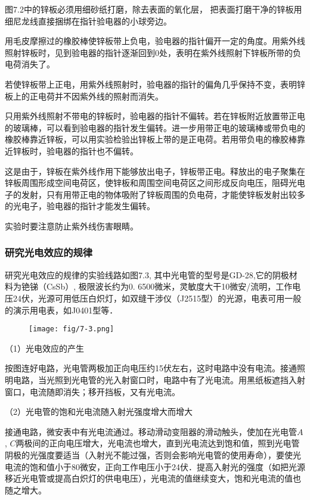 图7.2中的锌板必须用细砂纸打磨，除去表面的氧化层，
把表面打磨干净的锌板用细尼龙线直接捆绑在指针验电器的小球旁边。

用毛皮摩擦过的橡胶棒使锌板带上负电，验电器的指针偏开一定的角度。用紫外线照射锌板时，见到验电器的指针逐渐回到0处，表明在紫外线照射下锌板所带的负电荷消失了。

若使锌板带上正电，用紫外线照射时，验电器的指针的偏角几乎保持不变，表明锌板上的正电荷并不因紫外线的照射而消失。

只用紫外线照射不带电的锌板时，验电器的指针不偏转。若在锌板附近放置带正电的玻璃棒，可以看到验电器的指针发生偏转。进一步用带正电的玻璃棒或带负电的橡胶棒靠近锌板，可以用实验检验出锌板上带的是正电荷。若用带负电的橡胶棒靠近锌板时，验电器的指针也不偏转。

这是由于，锌板在紫外线作用下能够放出电子，锌板带正电。释放出的电子聚集在锌板周围形成空间电荷区，使锌板和周围空间电荷区之间形成反向电压，阻碍光电子的发射，只有用带正电的物体吸附了锌板周围的负电荷，才能使锌板发射出较多的光电子，验电器的指针才能发生偏转。

实验时要注意防止紫外线伤害眼睛。

\subsubsection{研究光电效应的规律}

研究光电效应的规律的实验线路如图7.3, 其中光电管的型号是GD-28,它的阴极材料为铯锑（CsSb）, 极限波长约为0. 6500微米，灵敏度大干10微安/流明，工作电压24伏，光源可用低压白炽灯，如双缝干涉仪（J2515型）的光源，电表可用一般的演示用电表，如J0401型等．
\begin{figure}[htp]
    \centering
\texttt{[image: fig/7-3.png]}
    \caption{}
\end{figure}

（1）光电效应的产生

按图连好电路，光电管两极加正向电压约15伏左右，这时电路中没有电流。接通照明电路，当光照到光电管的光入射窗口时，电路中有了光电流。用黑纸板遮挡入射窗口，电流随即消失；移开挡板，又有光电流。

（2）光电管的饱和光电流随入射光强度增大而增大

接通电路，微安表中有光电流通过。移动滑动变阻器的滑动触头，使加在光电管$A$, $C$两极间的正向电压增大，光电流也增大，直到光电流达到饱和值，照到光电管阴极的光强度要适当（入射光不能过强，否则会影响光电管的使用寿命），要使光电流的饱和值小于80微安，正向工作电压小于24伏．提高入射光的强度（如把光源移近光电管或提高白炽灯的供电电压），光电流的值继续变大，饱和光电流的值也随之增大。

